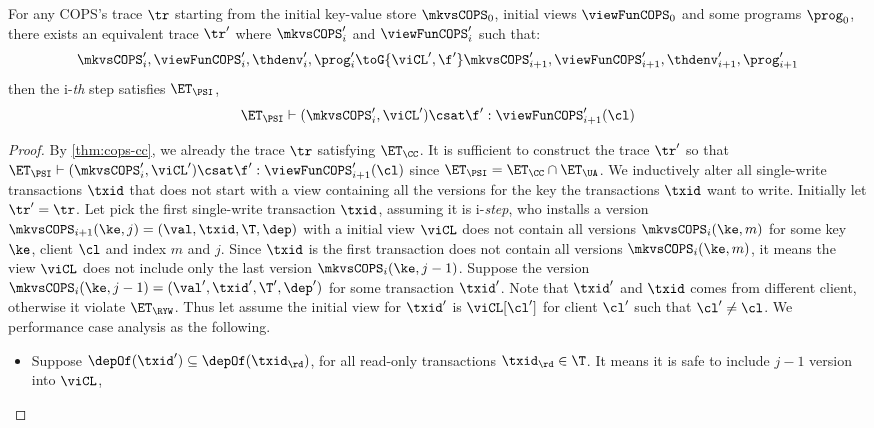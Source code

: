 \begin{theorem}
    For any COPS's trace \( \tr \) starting from the initial key-value store \( \mkvsCOPS_0 \), initial views \( \viewFunCOPS_0 \) and some programs \( \prog_0 \), 
    there exists an equivalent trace \( \tr' \) where \( \mkvsCOPS'_i \) and \( \viewFunCOPS'_i \)  such that: 
    \[
        \mkvsCOPS'_i, \viewFunCOPS'_i, \thdenv'_i, \prog'_i \toG{\viCL',\f'} \mkvsCOPS'_{i+1}, \viewFunCOPS'_{i+1}, \thdenv'_{i+1}, \prog'_{i+1} 
    \]
    then the i-\emph{th} step satisfies \( \ET_\PSI \), \ie
    \[
        \ET_\PSI \vdash ( \mkvsCOPS'_i, \viCL' ) \csat \f' : \viewFunCOPS'_{i+1}(\cl)
    \]
\end{theorem}
\begin{proof}
    By \cref{thm:cops-cc}, we already the trace \( \tr \) satisfying \( \ET_\CC \).
    It is sufficient to construct the trace \( \tr' \) so that 
    \( \ET_\PSI \vdash ( \mkvsCOPS'_i, \viCL' ) \csat \f' : \viewFunCOPS'_{i+1}(\cl) \) since \( \ET_\PSI = \ET_\CC \cap \ET_\UA\).
    We inductively alter all single-write transactions \( \txid \) that 
    does not start with a view containing all the versions for the key the transactions \( \txid \) want to write.
    Initially let \( \tr' = \tr \).
    Let pick the first single-write transaction \( \txid \), assuming it is i-\emph{step}, 
    who installs a version \( \mkvsCOPS_{i+1}(\ke,j) = (\val,\txid,\T,\dep )\) with a initial view \( \viCL \) does not contain all versions \( \mkvsCOPS_i(\ke,m) \)
    for some key \( \ke \), client \( \cl \) and index \( m \) and \( j \).
    Since \( \txid \) is the first transaction does not contain all versions \( \mkvsCOPS_i(\ke,m) \),
    it means the view \( \viCL \) does not include only the last version \( \mkvsCOPS_i(\ke,j-1) \).
    Suppose the version \( \mkvsCOPS_i(\ke,j-1) = (\val',\txid',\T',\dep' ) \) for some transaction \( \txid' \).
    Note that \( \txid' \)  and \( \txid \) comes from different client, otherwise it violate \( \ET_\RYW \).
    Thus let assume the initial view for \( \txid' \) is \( \viCL[\cl'] \) for client \( \cl' \) such that \( \cl' \neq \cl \).
    We performance case analysis as the following.
    \begin{itemize}                                                               
        \item Suppose \( \depOf(\txid') \subseteq \depOf(\txid_\rd) \), for all read-only transactions \( \txid_\rd \in \T \).
            It means it is safe to include \( j-1 \) version into \( \viCL \),

\end{itemize}
\end{proof}

